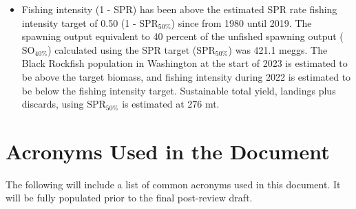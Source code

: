 \documentclass[11pt,
  english,
  letterpaper,
]{article}
\begin{document}
\begin{itemize}
\item  Fishing intensity (1 - SPR) has been above the estimated SPR rate fishing intensity target of 0.50 (1 - $\text{SPR}_{50\%}$) since from 1980 until 2019. The spawning output equivalent to 40 percent of the unfished spawning output ($\text{SO}_{40\%}$) calculated using the SPR target ($\text{SPR}_{50\%}$) was 421.1 meggs. The Black Rockfish population in Washington at the start of 2023 is estimated to be above the target biomass, and fishing intensity during 2022 is estimated to be below the fishing intensity target. Sustainable total yield, landings plus discards, using $\text{SPR}_{50\%}$ is estimated at 276 mt.   

\end{itemize}

\newpage

\hypertarget{acronyms-used-in-the-document}{%
\section*{Acronyms Used in the Document}\label{acronyms-used-in-the-document}}

The following will include a list of common acronyms used in this document. It will be fully populated prior to the final post-review draft.
\end{document}
